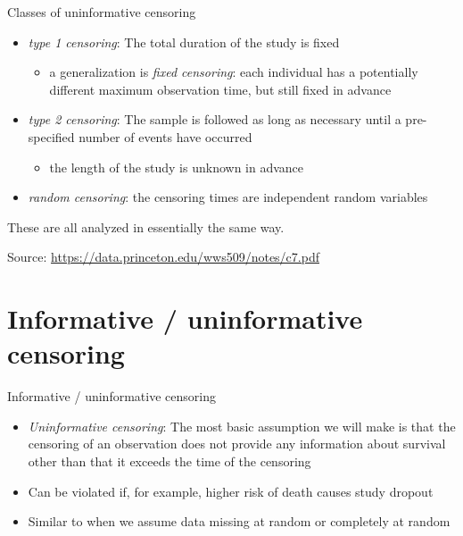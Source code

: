 \documentclass[
  ignorenonframetext,
]{beamer}
\providecommand{\tightlist}{%
  \setlength{\itemsep}{0pt}\setlength{\parskip}{0pt}}
\begin{document}
\begin{frame}{Classes of uninformative censoring}
\protect\hypertarget{classes-of-uninformative-censoring}{}

\begin{itemize}
\tightlist
\item
  \emph{type 1 censoring}: The total duration of the study is fixed

  \begin{itemize}
  \tightlist
  \item
    a generalization is \emph{fixed censoring}: each individual has a
    potentially different maximum observation time, but still fixed in
    advance
  \end{itemize}
\item
  \emph{type 2 censoring}: The sample is followed as long as necessary
  until a pre-specified number of events have occurred

  \begin{itemize}
  \tightlist
  \item
    the length of the study is unknown in advance
  \end{itemize}
\item
  \emph{random censoring}: the censoring times are independent random
  variables
\end{itemize}

These are all analyzed in essentially the same way.

\footnotesize

Source: \url{https://data.princeton.edu/wws509/notes/c7.pdf}

\end{frame}

\hypertarget{informative-uninformative-censoring}{%
\section{Informative / uninformative
censoring}\label{informative-uninformative-censoring}}

\begin{frame}{Informative / uninformative censoring}

\begin{itemize}
\tightlist
\item
  \emph{Uninformative censoring}: The most basic assumption we will make
  is that the censoring of an observation does not provide any
  information about survival other than that it exceeds the time of the
  censoring
\item
  Can be violated if, for example, higher risk of death causes study
  dropout
\item
  Similar to when we assume data missing at random or completely at
  random
\end{itemize}

\end{frame}
\end{document}
